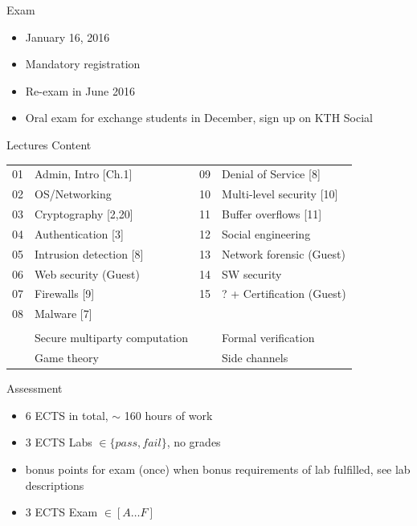\documentclass{beamer}
\begin{document}
\begin{frame}{Exam}
  \begin{itemize}
  \item January 16, 2016
  \item \alert{Mandatory} registration 
  \item Re-exam in June 2016
  \item Oral exam for exchange students in December,
    sign up on KTH Social
  \end{itemize}
\end{frame}

\begin{frame}{Lectures Content}
  \begin{tabular}{cl|cl}
    01 & Admin, Intro [Ch.1] &         09 & Denial of Service [8] \\
    02 & OS/Networking  &              10 & Multi-level security [10] \\
    03 & Cryptography [2,20] &         11 & Buffer overflows [11] \\
    04 & Authentication [3] &          12 & Social engineering \\
    05 & Intrusion detection [8] &     13 & Network forensic (Guest) \\
    06 & Web security (Guest) &        14 & SW security \\
    07 & Firewalls [9]  &              15 & ? + Certification (Guest) \\
    08 & Malware [7] \\
    & & &\\
    & Secure multiparty computation & & Formal verification\\
    & Game theory & & Side channels
  \end{tabular}
\end{frame}




\begin{frame}{Assessment}
  \begin{itemize}
  \item 6 ECTS in total, $\sim$ 160 hours of work 
  \item 3 ECTS Labs $\in \{pass,fail\}$, no grades
  \item bonus points for exam (once) when bonus 
    requirements of lab fulfilled, see lab descriptions
  \item 3 ECTS Exam $\in [A \dots F]$
  \end{itemize}
\end{frame}
\end{document}
